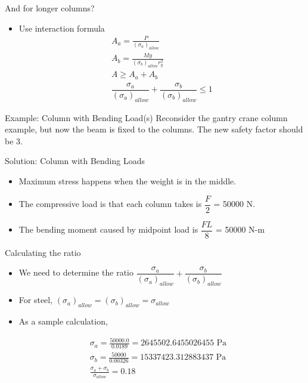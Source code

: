 \documentclass[10pt, svgnames]{beamer}
\begin{document}
\begin{frame}[label={sec:org8b2391c}]{And for longer columns?}
\begin{itemize}
\item Use interaction formula
\begin{gather*}
  A_a = \frac{P}{(\sigma_a)_{allow}} \\
  A_b = \frac{My}{(\sigma _b)_{allow}r_g^2} \\
  A \geqslant A_a + A_b \\
  \dfrac{\sigma _a}{(\sigma_a)_{allow}} + \dfrac{\sigma_b}{(\sigma_b)_{allow}} \leqslant 1
\end{gather*}
\end{itemize}
\end{frame}


\begin{frame}[label={sec:org4449287}]{Example: Column with Bending Load(s)}
Reconsider the gantry crane column example, but now the beam is fixed to the columns. The new safety factor should be 3.
\end{frame}


\begin{frame}[label={sec:org4bf6e67}]{Solution: Column with Bending Loads}
\begin{itemize}
\item Maximum stress happens when the weight is in the middle.
\item The compressive load is that each column takes is \(\dfrac{F}{2}\) = 50000 N.
\item The bending moment caused by midpoint load is \(\dfrac{FL}{8}\) = 50000 N-m
\end{itemize}
\end{frame}

\begin{frame}[label={sec:org635aa04}]{Calculating the ratio}
\begin{itemize}
\item We need to determine the ratio \(\dfrac{\sigma _a}{(\sigma_a)_{allow}} + \dfrac{\sigma_b}{(\sigma_b)_{allow}}\)
\item For steel, \((\sigma_a)_{allow} = (\sigma_b)_{allow} = \sigma_{allow}\)
\item As a sample calculation,
\end{itemize}

\begin{align*}
&\sigma_a = \frac{50000.0}{0.0189} =2645502.6455026455\text{ Pa} \\
&\sigma_b = \frac{50000}{0.00326} = 15337423.312883437\text{ Pa} \\
&\frac{\sigma_a + \sigma_b}{\sigma_{allow}} = 0.18
\end{align*}
\end{frame}
\end{document}
